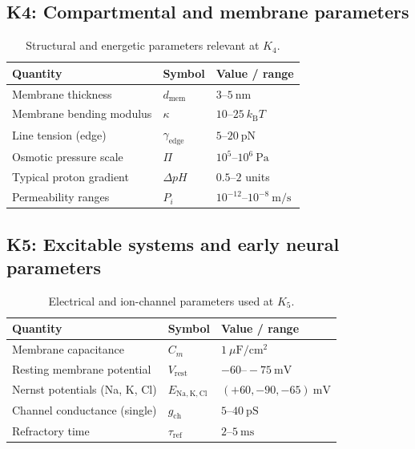 
\subsection*{K4: Compartmental and membrane parameters}

\begin{table}[h]
  \centering
  \caption{Structural and energetic parameters relevant at \(K_4\).}
  \label{tab:k4-membrane-parameters}
  \begin{tabular}{lll}
    \hline
    Quantity & Symbol & Value / range \\
    \hline
    Membrane thickness & \(d_\mathrm{mem}\)
        & \(3\text{–}5~\mathrm{nm}\) \\
    Membrane bending modulus & \(\kappa\)
        & \(10\text{–}25~k_\mathrm{B}T\) \\
    Line tension (edge) & \(\gamma_\mathrm{edge}\)
        & \(5\text{–}20~\mathrm{pN}\) \\
    Osmotic pressure scale & \(\Pi\)
        & \(10^5\text{–}10^6~\mathrm{Pa}\) \\
    Typical proton gradient & \(\Delta pH\)
        & \(0.5\text{–}2\) units \\
    Permeability ranges & \(P_i\)
        & \(10^{-12}\text{–}10^{-8}~\mathrm{m/s}\) \\
    \hline
  \end{tabular}
\end{table}


\subsection*{K5: Excitable systems and early neural parameters}

\begin{table}[h]
  \centering
  \caption{Electrical and ion-channel parameters used at \(K_5\).}
  \label{tab:k5-excitable-parameters}
  \begin{tabular}{lll}
    \hline
    Quantity & Symbol & Value / range \\
    \hline
    Membrane capacitance & \(C_m\)
        & \(1~\mu\mathrm{F/cm^2}\) \\
    Resting membrane potential & \(V_\mathrm{rest}\)
        & \(-60\text{–}-75~\mathrm{mV}\) \\
    Nernst potentials (Na, K, Cl) &
        \(E_{\mathrm{Na,K,Cl}}\)
        & \((+60, -90, -65)~\mathrm{mV}\) \\
    Channel conductance (single) & \(g_\mathrm{ch}\)
        & \(5\text{–}40~\mathrm{pS}\) \\
    Refractory time & \(\tau_\mathrm{ref}\)
        & \(2\text{–}5~\mathrm{ms}\) \\
    \hline
  \end{tabular}
\end{table}

